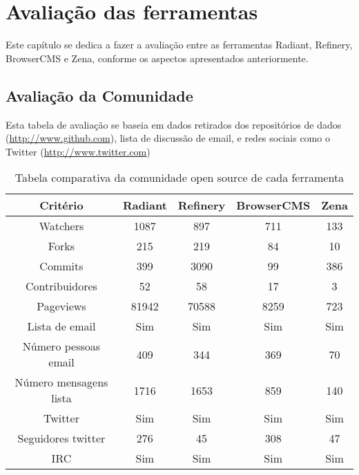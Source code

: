 \chapter{Avaliação das ferramentas}

Este capítulo se dedica a fazer a avaliação entre as ferramentas Radiant, Refinery, BrowserCMS e Zena, conforme os aspectos apresentados anteriormente.

\section{Avaliação da Comunidade}

Esta tabela de avaliação se baseia em dados retirados dos repositórios de dados (\url{http://www.github.com}), lista de discussão de email, e redes sociais como o Twitter (\url{http://www.twitter.com})

\begin{table}[ht]
\caption{Tabela comparativa da comunidade open source de cada ferramenta } %
\centering %
\begin{tabular}{c c c c c} %
\hline\hline %
Critério & Radiant & Refinery & BrowserCMS & Zena \\ [0.5ex] %
\hline %
Watchers               & 1087  & 897   & 711  & 133  \\ %
Forks                  & 215   & 219   & 84   & 10   \\
Commits                & 399   & 3090  & 99   & 386  \\
Contribuidores         & 52    & 58    & 17   & 3    \\ 
Pageviews              & 81942 & 70588 & 8259 & 723  \\ 
Lista de email         & Sim   & Sim   & Sim  & Sim  \\ 
Número pessoas email   & 409   & 344   & 369  & 70   \\ 
Número mensagens lista & 1716  & 1653  & 859  & 140  \\ 
Twitter                & Sim   & Sim   & Sim  & Sim  \\ 
Seguidores twitter     & 276   & 45    & 308  & 47   \\ 
IRC                    & Sim   & Sim   & Sim  & Sim  \\ [1ex] %
\hline %
\end{tabular}
\label{table:nonlin} %
\end{table}

